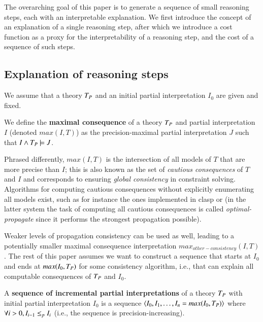 
The overarching goal of this paper is to generate a sequence of small reasoning steps, each with an interpretable explanation. 
We first introduce the concept of an explanation of a single reasoning step, after which we introduce a cost function as a proxy for the interpretability of a reasoning step, and the cost of a sequence of such steps. 

\subsection{Explanation of reasoning steps}
We assume that a theory $T_P$ and an initial partial interpretation $I_0$ are given and fixed. 

\begin{definition}
We define the \textbf{maximal consequence} of a theory $T_P$ and partial interpretation $I$ (denoted $max(I,T)$) as the precision-maximal partial interpretation $J$ such that  $I \wedge T_P \models J$. 
\end{definition}

Phrased differently, $max(I,T)$ is the intersection of all models of $T$ that are more precise than $I$; this is also known as the set of \emph{cautious consequences} of $T$ and $I$ and corresponds to ensuring \emph{global consistency} in constraint solving.
Algorithms for computing cautious consequences without explicitly enumerating all models exist, such as for instance the ones implemented in clasp \cite{DBLP:conf/lpnmr/GebserKS09} or \idp \cite{IDP} (in the latter system the task of computing all cautious consequences is called \emph{optimal-propagate} since it performs the strongest propagation possible).

Weaker levels of propagation consistency can be used as well, leading to a potentially smaller maximal consequence interpretation $max_{other-consistency}(I,T)$. 
The rest of this paper assumes we want to construct a sequence that starts at $I_0$ and ends at $max(I_0,T_P)$ for some consistency algorithm, i.e., that can explain all computable consequences of $T_P$ and $I_0$. 
\begin{definition}
A \textbf{sequence of incremental partial interpretations} of a theory $T_P$ with initial partial interpretation $I_0$ is a sequence $\langle I_0, I_1, \ldots, I_n  = max(I_0,T_P)\rangle$ where $\forall i>0, I_{i-1} \leq_p I_{i}$ (i.e., the sequence is precision-increasing).
\end{definition} 


